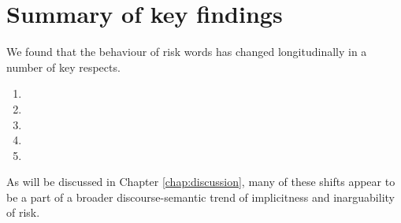 \section{Summary of key findings}

    We found that the behaviour of risk words has changed longitudinally in a number of key respects.

    \begin{enumerate}
    \item 
    \item 
    \item 
    \item 
    \item 
    \end{enumerate}

    As will be discussed in Chapter \ref{chap:discussion}, many of these shifts appear to be a part of a broader discourse-semantic trend of implicitness and inarguability of risk. 


%

